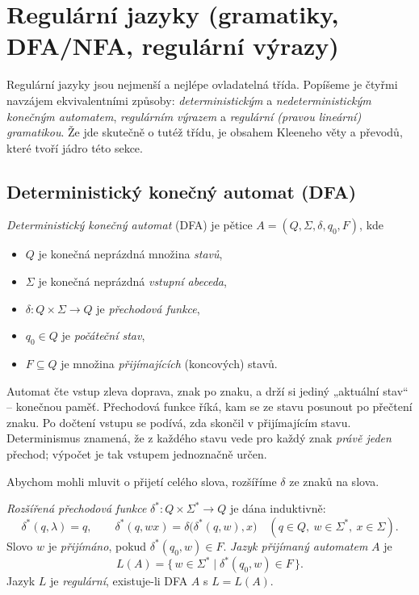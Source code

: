 \documentclass[11pt,a4paper]{article}
\begin{document}
\section{Regulární jazyky (gramatiky, DFA/NFA, regulární výrazy)}

Regulární jazyky jsou nejmenší a nejlépe ovladatelná třída. Popíšeme je čtyřmi navzájem ekvivalentními způsoby: \emph{deterministickým} a \emph{nedeterministickým konečným automatem}, \emph{regulárním výrazem} a \emph{regulární (pravou lineární) gramatikou}. Že jde skutečně o tutéž třídu, je obsahem Kleeneho věty a převodů, které tvoří jádro této sekce.

\subsection{Deterministický konečný automat (DFA)}

\begin{definice}
\emph{Deterministický konečný automat} (DFA) je pětice $A=(Q,\Sigma,\delta,q_0,F)$, kde
\begin{itemize}
  \item $Q$ je konečná neprázdná množina \emph{stavů},
  \item $\Sigma$ je konečná neprázdná \emph{vstupní abeceda},
  \item $\delta\colon Q\times\Sigma\to Q$ je \emph{přechodová funkce},
  \item $q_0\in Q$ je \emph{počáteční stav},
  \item $F\subseteq Q$ je množina \emph{přijímajících} (koncových) stavů.
\end{itemize}
\end{definice}

\begin{intuice}
Automat čte vstup zleva doprava, znak po znaku, a drží si jediný „aktuální stav`` -- konečnou paměť. Přechodová funkce říká, kam se ze stavu posunout po přečtení znaku. Po dočtení vstupu se podívá, zda skončil v přijímajícím stavu. Determinismus znamená, že z každého stavu vede pro každý znak \emph{právě jeden} přechod; výpočet je tak vstupem jednoznačně určen.
\end{intuice}

Abychom mohli mluvit o přijetí celého slova, rozšíříme $\delta$ ze znaků na slova.

\begin{definice}
\emph{Rozšířená přechodová funkce} $\delta^*\colon Q\times\Sigma^*\to Q$ je dána induktivně:
\[ \delta^*(q,\lambda)=q,\qquad \delta^*(q,wx)=\delta\big(\delta^*(q,w),x\big)\quad(q\in Q,\ w\in\Sigma^*,\ x\in\Sigma). \]
Slovo $w$ je \emph{přijímáno}, pokud $\delta^*(q_0,w)\in F$. \emph{Jazyk přijímaný automatem} $A$ je
\[ L(A)=\{\,w\in\Sigma^*\mid \delta^*(q_0,w)\in F\,\}. \]
Jazyk $L$ je \emph{regulární}, existuje-li DFA $A$ s $L=L(A)$.
\end{definice}
\end{document}
